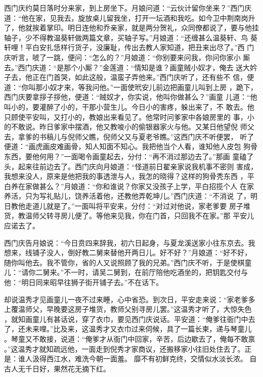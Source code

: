 西门庆约莫日落时分来家，到上房坐下。月娘问道：“云伙计留你坐来？”西门庆
道：“他在家，见我去，旋放桌儿留我坐，打开一坛酒和我吃。如今卫中荆南岗升
了，他就挨着掌印。明日连他和乔亲家，就是两分贺礼，众同僚都说了，要与他挂
轴子，少不得教温葵轩做两篇文章，买轴子写。”月娘道：“还缠甚么温葵轩、鸟
葵轩哩！平白安扎恁样行货子，没廉耻，传出去教人家知道，把丑来出尽了。”西
门庆听言，唬了一跳，便问：“怎么的？”月娘道：“你别要来问我，你问你家小
厮去。”西门庆道：“是那个小厮？”金莲道：“情知是谁？画童贼小奴才，俺去
送大妗子去，他正在门首哭，如此这般，温蛮子弄他来。”西门庆听了，还有些不
信，便道：“你叫那小奴才来，等我问他。”一面使玳安儿前边把画童儿叫到上房
，跪下，西门庆要拿拶子拶他，便道：“贼奴才，你实说，他叫你做甚么？”画童
儿道：“他叫小的，要灌醉了小的，干那小营生儿。今日小的害疼，躲出来了，不
敢去。他只顾使平安叫，又打小的，教娘出来看见了。他常时问爹家中各娘房里的
事，小的不敢说。昨日爹家中摆酒，他又教唆小的偷银器家火与他。又某日他望倪
师父去，拿爹的书稿儿与倪师父瞧，倪师父又与夏老爷瞧。”这西门庆不听便罢，
听了便道：“画虎画皮难画骨，知人知面不知心。我把他当个人看，谁知他人皮包
狗骨东西，要他何用？”一面喝令画童起去，分付：“再不消过那边去了。”那画
童磕了头，起来往前边去了。西门庆向月娘道：“怪道前日翟亲家说我机事不密则
害成，我想来没人，原来是他把我的事透泄与人，我怎的晓得？这样的狗骨秃东西
，平白养在家做甚么？”月娘道：“你和谁说？你家又没孩子上学，平白招揽个人
在家养活，只为写礼贴儿，饶养活着他，还教他弄乾坤儿。”西门庆道：“不消说
了，明日教他走道儿就是了。”一面叫将平安来，分付：“对过对他说，家老爹要
房子堆货，教温师父转寻房儿便了。等他来见我，你在门首，只回我不在家。”那
平安儿应诺去了。

西门庆告月娘说：“今日贲四来辞我，初六日起身，与夏龙溪送家小往东京去。我
想来，线铺子没人，倒好教二舅来替他开两日儿。好不好？”月娘道：“好不好，
随你叫他去。我不管你，省的人又说照顾了我的兄弟。”西门庆不听，于是使棋童
儿：“请你二舅来。”不一时，请吴二舅到，在前厅陪他吃酒坐的，把钥匙交付与
他：“明日同来昭早往狮子街开铺子去。”不在话下。

却说温秀才见画童儿一夜不过来睡，心中省恐。到次日，平安走来说：“家老爹多
上覆温师父，早晚要这房子堆货，教师父别寻房儿罢。”这温秀才听了，大惊失色
，就知画童儿有甚话说，穿了衣巾，要见西门庆说话。平安道：“俺爹往衙门中去
了，还未来哩。”比及来，这温秀才又衣巾过来伺候，具了一篇长柬，递与琴童儿
。琴童又不敢接，说道：“俺爹才从衙门中回家，辛苦，后边歇去了，俺每不敢禀
。”这温秀才就知疏远他，一面走到倪秀才家商议，还搬移家小往旧处住去了。正
是：谁人汲得西江水，难洗今朝一面羞。
靡不有初鲜克终，交情似水淡长浓。
自古人无千日好，果然花无摘下红。